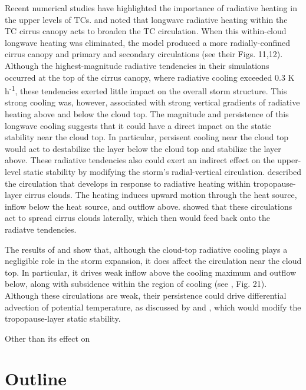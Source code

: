 Recent numerical studies have highlighted the importance of radiative heating in the upper levels of TCs.
\cite{Buetal2014} and \cite{Fovelletal2016} noted that longwave radiative heating within the TC cirrus canopy acts to broaden the TC circulation.
When this within-cloud longwave heating was eliminated, the model produced a more radially-confined cirrus canopy and primary and secondary circulations (see their Figs. 11,12).
Although the highest-magnitude radiative tendencies in their simulations occurred at the top of the cirrus canopy, where radiative cooling exceeded 0.3 K h\textsuperscript{-1}, these tendencies exerted little impact on the overall storm structure.
This strong cooling was, however, associated with strong vertical gradients of radiative heating above and below the cloud top.
The magnitude and persistence of this longwave cooling suggests that it could have a direct impact on the static stability near the cloud top.
In particular, persisent cooling near the cloud top would act to destabilize the layer below the cloud top and stabilize the layer above.
These radiative tendencies also could exert an indirect effect on the upper-level static stability by modifying the storm's radial-vertical circulation.
\cite{Durranetal2009} described the circulation that develops in response to radiative heating within tropopause-layer cirrus clouds.
The heating induces upward motion through the heat source, inflow below the heat source, and outflow above.
\cite{Dinhetal2010} showed that these circulations act to spread cirrus clouds laterally, which then would feed back onto the radiatve tendencies.

The results of \cite{Buetal2014} and \cite{Fovelletal2016} show that, although the cloud-top radiative cooling plays a negligible role in the storm expansion, it does affect the circulation near the cloud top.
In particular, it drives weak inflow above the cooling maximum and outflow below, along with subsidence within the region of cooling (see \citeauthor{Fovelletal2016} \citeyear{Fovelletal2016}, Fig. 21).
Although these circulations are weak, their persistence could drive differential advection of potential temperature, as discussed by \cite{ChenZhang2013} and \cite{ChenGopalakrishnan2015},  which would modify the tropopause-layer static stability.

Other than its effect on 

\section{Outline}

